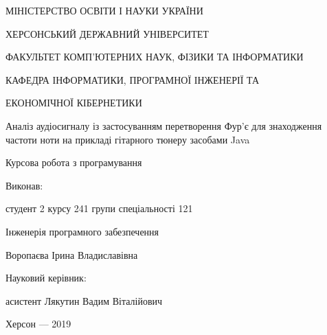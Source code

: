 \thispagestyle{empty}

{\centering
МІНІСТЕРСТВО ОСВІТИ І НАУКИ УКРАЇНИ

ХЕРСОНСЬКИЙ ДЕРЖАВНИЙ УНІВЕРСИТЕТ

ФАКУЛЬТЕТ КОМП'ЮТЕРНИХ НАУК, ФІЗИКИ ТА ІНФОРМАТИКИ

КАФЕДРА ІНФОРМАТИКИ, ПРОГРАМНОЇ ІНЖЕНЕРІЇ ТА 

ЕКОНОМІЧНОЇ КІБЕРНЕТИКИ

\vfill

Аналіз аудіосигналу із застосуванням перетворення Фур'є для знаходження частоти ноти на прикладі гітарного тюнеру засобами Java

Курсова робота з програмування

}

\vfill

\hfill\begin{minipage}[t]{0.6\textwidth}
Виконав: 

студент 2 курсу 241 групи спеціальності 121

Інженерія програмного забезпечення

Воропаєва Ірина Владиславівна

Науковий керівник:

асистент Лякутин Вадим Віталійович

\end{minipage}

\vfill

{\centering
Херсон --- 2019

}